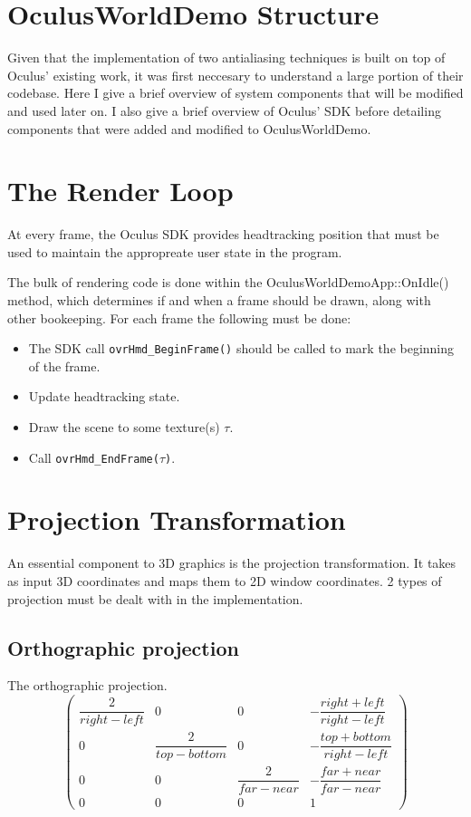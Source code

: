 \documentclass[12pt,a4paper,twoside,openright]{report}
\begin{document}
\section{OculusWorldDemo Structure}

Given that the implementation of two antialiasing techniques is built on top of Oculus' existing work, it was first neccesary to understand a large portion of their codebase.
Here I give a brief overview of system components that will be modified and used later on. I also give a brief overview of Oculus' SDK before detailing components that were added and modified to OculusWorldDemo.

\section{The Render Loop}
At every frame, the Oculus SDK provides headtracking position that must be used to maintain the appropreate user state in the program.

The bulk of rendering code is done within the OculusWorldDemoApp::OnIdle() method, which determines if and when a frame should be drawn, along with other bookeeping.
For each frame the following must be done:

\begin{itemize}
  \item The SDK call \texttt{ovrHmd\_BeginFrame()} should be called to mark the beginning of the frame.
  \item Update headtracking state.
  \item Draw the scene to some texture(s) $\tau$.
  \item Call \texttt{ovrHmd\_EndFrame($\tau$)}.
\end{itemize}

\section{Projection Transformation}

An essential component to 3D graphics is the projection transformation. It takes as input 3D coordinates and maps them to 2D window coordinates.
2 types of projection must be dealt with in the implementation.

\subsection{Orthographic projection}
The orthographic projection.
\[
\begin{pmatrix}
\dfrac{2}{right-left} & 0 & 0 & -\dfrac{right+left}{right-left} \\
0 & \dfrac{2}{top-bottom} & 0 & -\dfrac{top+bottom}{right-left} \\
0 & 0 & \dfrac{2}{far-near} & -\dfrac{far + near}{far-near} \\
0 & 0 & 0 & 1
\end{pmatrix}
\]
\end{document}
